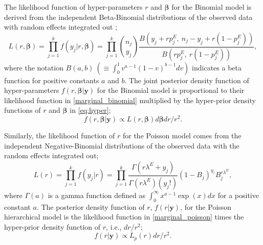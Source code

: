 \documentclass[article]{jss}
\begin{document}
The likelihood function of hyper-parameters $r$ and $\boldsymbol{\beta}$ for the Binomial  model is derived from the independent Beta-Binomial  distributions of the observed data with random effects integrated out \citep{skellam1948}; %
\begin{equation}\label{marginal_binomial}
L(r, \boldsymbol{\boldsymbol{\beta}})=\prod_{j=1}^k f(y_j\vert r, \boldsymbol{\boldsymbol{\beta}})=\prod_{j=1}^k\binom{n_j}{y_j}\frac{B(y_j+rp^E_j, ~n_j-y_j+r(1-p^E_j))}{B(rp^E_j, ~r(1-p^E_j))},
\end{equation}
where the notation $B(a, b)~(\equiv\int_0^1 v^{a-1}(1-v)^{b-1}dv)$ indicates a beta function for positive constants $a$ and $b$. The joint posterior density  function of hyper-parameters $f(r, \boldsymbol{\boldsymbol{\beta}}\vert \boldsymbol{y})$ for the Binomial  model is proportional to their likelihood function in \eqref{marginal_binomial} multiplied by the hyper-prior density functions of $r$ and $\boldsymbol{\beta}$ in  \eqref{eq:hyper};
\begin{equation}\label{marginal_post_binomial}
f(r, \boldsymbol{\boldsymbol{\beta}}\vert \boldsymbol{y})\propto L(r, \boldsymbol{\boldsymbol{\beta}})d\boldsymbol{\beta}dr/r^2.
\end{equation}


Similarly, the likelihood function of $r$ for the Poisson  model  comes from the independent Negative-Binomial  distributions of the observed data with the random effects integrated out;
\begin{equation}\label{marginal_poisson}
L(r)=\prod_{j=1}^k f(y_j\vert r)=\prod^{k}_{j=1} \frac{\Gamma(r \lambda^E+y_j)}{\Gamma(r\lambda^E)(y_j!)}(1-B_{j})^{y_{i}}B_{j}^{r \lambda^E},
\end{equation}
where $\Gamma(a)$ is a gamma function defined as $\int_0^\infty x^{a-1}\exp(x)dx$ for a positive constant $a$. The posterior density function of $r$, $f(r\vert \boldsymbol{y})$, for the Poisson hierarchical model is  the likelihood function in  \eqref{marginal_poisson} times the hyper-prior density function of $r$, i.e., $dr/r^2$;
\begin{equation}\label{marginal_post_poisson}
f(r \vert \boldsymbol{y})\propto L_p(r)dr/r^2.
\end{equation}


\end{document}
